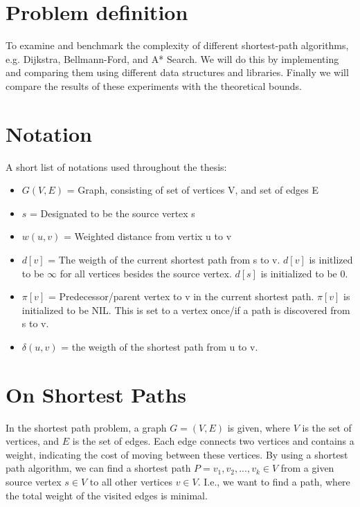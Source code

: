 \documentclass[11pt]{article}
\begin{document}
\section{Problem definition}
To examine and benchmark the complexity of different shortest-path algorithms, e.g. Dijkstra, Bellmann-Ford, and A* Search. We will do this by implementing and comparing them using different data structures and libraries. Finally we will compare the results of these experiments with the theoretical bounds.

\section{Notation}
A short list of notations used throughout the thesis:
\begin{itemize}
\item $G(V,E)$ = Graph, consisting of set of vertices V, and set of edges E
\item $s$ = Designated to be the source vertex s
\item $w(u,v)$ = Weighted distance from vertix u to v
\item $d[v]$ = The weigth of the current shortest path from s to v. $d[v]$ is initlized to be $\infty$ for all vertices besides the source vertex. $d[s]$ is initialized to be 0.
\item $\pi[v]$ = Predecessor/parent vertex to v in the current shortest path. $\pi[v]$ is initialized to be NIL. This is set to a vertex once/if a path is discovered from s to v.
\item $\delta(u,v)$ = the weigth of the shortest path from u to v.
\end{itemize}

\section{On Shortest Paths}
In the shortest path problem, a graph $G = (V,E)$ is given, where $V$	
is the set of vertices, and $E$ is the set of edges. Each edge
connects two vertices and contains a weight, indicating the cost of
moving between these vertices. By using a shortest path algorithm, we
can find a shortest path $P = {v_{1}, v_{2}, ..., v_{k}} \in V$ from a
given source vertex $s \in V$ to all other vertices $v \in V$. I.e.,
we want to find a path, where the total weight of the visited edges is
minimal.\\
\end{document}
